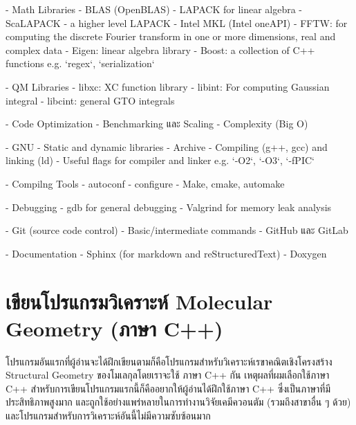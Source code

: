 - Math Libraries
- BLAS (OpenBLAS)
- LAPACK for linear algebra
- ScaLAPACK - a higher level LAPACK
- Intel MKL (Intel oneAPI)
- FFTW: for computing the discrete Fourier transform in one or more dimensions, real and complex data
- Eigen: linear algebra library
- Boost: a collection of C++ functions e.g. `regex`, `serialization`

- QM Libraries
- libxc: XC function library
- libint: For computing Gaussian integral
- libcint: general GTO integrals

- Code Optimization
- Benchmarking และ Scaling
- Complexity (Big O)

- GNU
- Static and dynamic libraries
- Archive
- Compiling (g++, gcc) and linking (ld)
- Useful flags for compiler and linker e.g. `-O2`, `-O3`, `-fPIC`

- Compilng Tools
- autoconf
- configure
- Make, cmake, automake

- Debugging
- gdb for general debugging
- Valgrind for memory leak analysis

- Git (source code control)
- Basic/intermediate commands
- GitHub และ GitLab

- Documentation
- Sphinx (for markdown and reStructuredText)
- Doxygen

\section{เขียนโปรแกรมวิเคราะห์ Molecular Geometry (ภาษา C++)}

โปรแกรมอันแรกที่ผู้อ่านจะได้ฝึกเขียนตามก็คือโปรแกรมสำหรับวิเคราะห์เรขาคณิตเชิงโครงสร้าง Structural Geometry ของโมเลกุลโดยเราจะใช้%
ภาษา C++ กัน เหตุผลที่ผมเลือกใช้ภาษา C++ สำหรับการเขียนโปรแกรมแรกนี้ก็คืออยากให้ผู้อ่านได้ฝึกใช้ภาษา C++ ซึ่งเป็นภาษาที่มีประสิทธิภาพสูงมาก%
และถูกใช้อย่างแพร่หลายในการทำงานวิจัยเคมีควอนตัม (รวมถึงสาขาอื่น ๆ ด้วย) และโปรแกรมสำหรับการวิเคราะห์อันนี้ไม่มีความซับซ้อนมาก

\noindent {}

\vspace{5pt}

